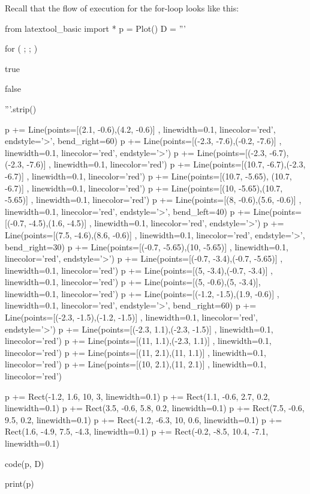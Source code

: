 Recall that the flow of execution for the for-loop looks like this:
\begin{python}
from latextool_basic import *
p = Plot()
D = '''





for (         ;                ;                )








true

         

false





'''.strip()

p += Line(points=[(2.1, -0.6),(4.2, -0.6)] , linewidth=0.1, linecolor='red', endstyle='>', bend_right=60)
p += Line(points=[(-2.3, -7.6),(-0.2, -7.6)] , linewidth=0.1, linecolor='red', endstyle='>')
p += Line(points=[(-2.3, -6.7),(-2.3, -7.6)] , linewidth=0.1, linecolor='red')
p += Line(points=[(10.7, -6.7),(-2.3, -6.7)] , linewidth=0.1, linecolor='red')
p += Line(points=[(10.7, -5.65), (10.7, -6.7)] , linewidth=0.1, linecolor='red')
p += Line(points=[(10, -5.65),(10.7, -5.65)] , linewidth=0.1, linecolor='red')
p += Line(points=[(8, -0.6),(5.6, -0.6)] , linewidth=0.1, linecolor='red', endstyle='>', bend_left=40)
p += Line(points=[(-0.7, -4.5),(1.6, -4.5)] , linewidth=0.1, linecolor='red', endstyle='>')
p += Line(points=[(7.5, -4.6),(8.6, -0.6)] , linewidth=0.1, linecolor='red', endstyle='>', bend_right=30)
p += Line(points=[(-0.7, -5.65),(10, -5.65)] , linewidth=0.1, linecolor='red', endstyle='>')
p += Line(points=[(-0.7, -3.4),(-0.7, -5.65)] , linewidth=0.1, linecolor='red')
p += Line(points=[(5, -3.4),(-0.7, -3.4)] , linewidth=0.1, linecolor='red')
p += Line(points=[(5, -0.6),(5, -3.4)], linewidth=0.1, linecolor='red')
p += Line(points=[(-1.2, -1.5),(1.9, -0.6)] , linewidth=0.1, linecolor='red', endstyle='>', bend_right=60)
p += Line(points=[(-2.3, -1.5),(-1.2, -1.5)] , linewidth=0.1, linecolor='red', endstyle='>')
p += Line(points=[(-2.3, 1.1),(-2.3, -1.5)] , linewidth=0.1, linecolor='red')
p += Line(points=[(11, 1.1),(-2.3, 1.1)] , linewidth=0.1, linecolor='red')
p += Line(points=[(11, 2.1),(11, 1.1)] , linewidth=0.1, linecolor='red')
p += Line(points=[(10, 2.1),(11, 2.1)] , linewidth=0.1, linecolor='red')

p += Rect(-1.2, 1.6, 10, 3, linewidth=0.1)
p += Rect(1.1, -0.6, 2.7, 0.2, linewidth=0.1)
p += Rect(3.5, -0.6, 5.8, 0.2, linewidth=0.1)
p += Rect(7.5, -0.6, 9.5, 0.2, linewidth=0.1)
p += Rect(-1.2, -6.3, 10, 0.6, linewidth=0.1)
p += Rect(1.6, -4.9, 7.5, -4.3, linewidth=0.1)
p += Rect(-0.2, -8.5, 10.4, -7.1, linewidth=0.1)

code(p, D)

print(p)
\end{python}

